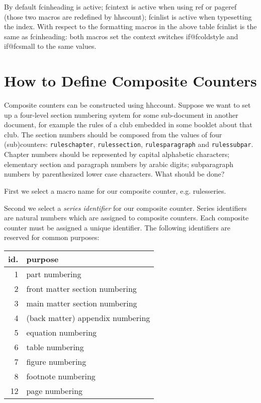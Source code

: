 \documentclass[11pt]{article}
\makeatletter
\def\packagename#1{{\sffamily #1}}     %
\def\macroname#1{{\ttfamily\@ttbs#1}}  %
\def\hhscount{\packagename{hhscount}\xspace}
\def\hhccount{\packagename{hhccount}\xspace}
\def\<#1>{\macroname{#1}}
\makeatother
\begin{document}
By default \<fcinheading> is active; \<fcintext> is active when using
\<ref> or \<pageref> (those two macros are redefined by \hhscount);
\<fcinlist> is active when typesetting the index. With respect to the
formatting macros in the above table \<fcinlist> is the same as \<fcinheading>:
both macros set the context switches \<if@fcoldstyle> and \<if@fcsmall>
to the same values.

\section{How to Define Composite Counters}

Composite counters can be constructed using \hhccount.
Suppose we want to set up a four-level section numbering system for
some sub-document in another document, for example the rules of a club
embedded in some booklet about that club.
The section numbers should be composed from the values of four
\hbox{(sub)}counters: {\tt ruleschapter},
{\tt rulessection}, {\tt rulesparagraph} and {\tt rulessubpar}. Chapter numbers
should be represented by capital alphabetic characters;
elementary section and paragraph numbers by arabic digits;
subparagraph numbers by parenthesized lower case characters.
What should be done?

First we select a macro name for our composite counter,
e.g. \<rulesseries>.

Second we select a {\it series identifier} for our composite counter.
Series identifiers are natural numbers which are assigned to
composite counters. Each composite counter must be assigned a unique
identifier. The following identifiers are reserved for common purposes:

\begin{tabular}{|r|l|}\hline
  id. & purpose \\\hline
   1  & part numbering \\
   2  & front matter section numbering \\
   3  & main matter section numbering \\
   4  & (back matter) appendix numbering \\
   5  & equation numbering \\
   6  & table numbering \\
   7  & figure numbering \\
   8  & footnote numbering \\
  12  & page numbering \\\hline
\end{tabular}
\end{document}
